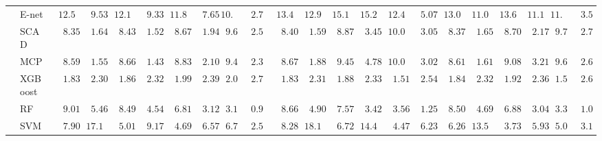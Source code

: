 \documentclass{article}
\begin{document}
\begin{tabular}{ll|ll|llllll|llllll|llllll}
 & E-net  & $\phantom{0}12.56$ & $\phantom{00}9.53$ & $\phantom{0}12.11$ & $\phantom{00}9.33$ & $\phantom{0}11.89$ & $\phantom{00}7.65$ & $10.61$ & $\phantom{0}2.72$ & $\phantom{0}13.40$ & $\phantom{0}12.95$ & $\phantom{0}15.16$ & $\phantom{0}15.27$ & $\phantom{0}12.46$ & $\phantom{00}5.07$ & $\phantom{0}13.07$ & $\phantom{0}11.09$ & $\phantom{0}13.68$ & $\phantom{0}11.16$ & $11.00$ & $\phantom{0}3.52$ \\
 & SCAD  & $\phantom{00}8.35$ & $\phantom{00}1.64$ & $\phantom{00}8.43$ & $\phantom{00}1.52$ & $\phantom{00}8.67$ & $\phantom{00}1.94$ & $\phantom{0}9.67$ & $\phantom{0}2.56$ & $\phantom{00}8.40$ & $\phantom{00}1.59$ & $\phantom{00}8.87$ & $\phantom{00}3.45$ & $\phantom{0}10.02$ & $\phantom{00}3.05$ & $\phantom{00}8.37$ & $\phantom{00}1.65$ & $\phantom{00}8.70$ & $\phantom{00}2.17$ & $\phantom{0}9.77$ & $\phantom{0}2.72$ \\
 & MCP  & $\phantom{00}8.59$ & $\phantom{00}1.55$ & $\phantom{00}8.66$ & $\phantom{00}1.43$ & $\phantom{00}8.83$ & $\phantom{00}2.10$ & $\phantom{0}9.47$ & $\phantom{0}2.31$ & $\phantom{00}8.67$ & $\phantom{00}1.88$ & $\phantom{00}9.45$ & $\phantom{00}4.78$ & $\phantom{0}10.02$ & $\phantom{00}3.02$ & $\phantom{00}8.61$ & $\phantom{00}1.61$ & $\phantom{00}9.08$ & $\phantom{00}3.21$ & $\phantom{0}9.65$ & $\phantom{0}2.61$ \\
 & XGBoost  & $\phantom{00}1.83$ & $\phantom{00}2.30$ & $\phantom{00}1.86$ & $\phantom{00}2.32$ & $\phantom{00}1.99$ & $\phantom{00}2.39$ & $\phantom{0}2.04$ & $\phantom{0}2.73$ & $\phantom{00}1.83$ & $\phantom{00}2.31$ & $\phantom{00}1.88$ & $\phantom{00}2.33$ & $\phantom{00}1.51$ & $\phantom{00}2.54$ & $\phantom{00}1.84$ & $\phantom{00}2.32$ & $\phantom{00}1.92$ & $\phantom{00}2.36$ & $\phantom{0}1.56$ & $\phantom{0}2.60$ \\
 & RF  & $\phantom{00}9.01$ & $\phantom{00}5.46$ & $\phantom{00}8.49$ & $\phantom{00}4.54$ & $\phantom{00}6.81$ & $\phantom{00}3.12$ & $\phantom{0}3.18$ & $\phantom{0}0.96$ & $\phantom{00}8.66$ & $\phantom{00}4.90$ & $\phantom{00}7.57$ & $\phantom{00}3.42$ & $\phantom{00}3.56$ & $\phantom{00}1.25$ & $\phantom{00}8.50$ & $\phantom{00}4.69$ & $\phantom{00}6.88$ & $\phantom{00}3.04$ & $\phantom{0}3.38$ & $\phantom{0}1.07$ \\
 & SVM  & $\phantom{00}7.90$ & $\phantom{0}17.17$ & $\phantom{00}5.01$ & $\phantom{00}9.17$ & $\phantom{00}4.69$ & $\phantom{00}6.57$ & $\phantom{0}6.76$ & $\phantom{0}2.56$ & $\phantom{00}8.28$ & $\phantom{0}18.17$ & $\phantom{00}6.72$ & $\phantom{0}14.47$ & $\phantom{00}4.47$ & $\phantom{00}6.23$ & $\phantom{00}6.26$ & $\phantom{0}13.53$ & $\phantom{00}3.73$ & $\phantom{00}5.93$ & $\phantom{0}5.00$ & $\phantom{0}3.11$ \\\hline

\end{tabular}
\end{document}
